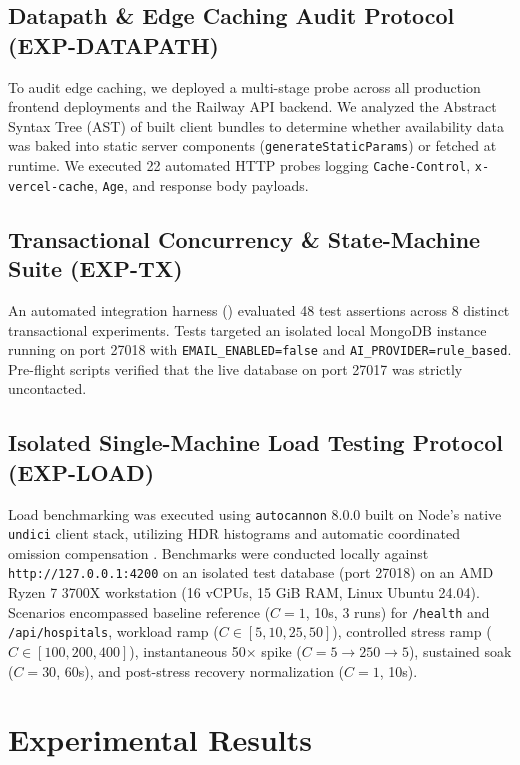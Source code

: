 \documentclass[conference]{IEEEtran}
\begin{document}
\subsection{Datapath \& Edge Caching Audit Protocol (EXP-DATAPATH)}
To audit edge caching, we deployed a multi-stage probe across all production frontend deployments and the Railway API backend. We analyzed the Abstract Syntax Tree (AST) of built client bundles to determine whether availability data was baked into static server components (\texttt{generateStaticParams}) or fetched at runtime. We executed 22 automated HTTP probes logging \texttt{Cache-Control}, \texttt{x-vercel-cache}, \texttt{Age}, and response body payloads.

\subsection{Transactional Concurrency \& State-Machine Suite (EXP-TX)}
An automated integration harness () evaluated 48 test assertions across 8 distinct transactional experiments. Tests targeted an isolated local MongoDB instance running on port 27018 with \texttt{EMAIL\_ENABLED=false} and \texttt{AI\_PROVIDER=rule\_based}. Pre-flight scripts verified that the live database on port 27017 was strictly uncontacted.

\subsection{Isolated Single-Machine Load Testing Protocol (EXP-LOAD)}
Load benchmarking was executed using \texttt{autocannon} 8.0.0 built on Node's native \texttt{undici} client stack, utilizing HDR histograms and automatic coordinated omission compensation \cite{tene2014latency}. Benchmarks were conducted locally against \texttt{http://127.0.0.1:4200} on an isolated test database (port 27018) on an AMD Ryzen 7 3700X workstation (16 vCPUs, 15 GiB RAM, Linux Ubuntu 24.04). Scenarios encompassed baseline reference ($C=1$, 10s, 3 runs) for \texttt{/health} and \texttt{/api/hospitals}, workload ramp ($C \in [5, 10, 25, 50]$), controlled stress ramp ($C \in [100, 200, 400]$), instantaneous 50$\times$ spike ($C=5 \to 250 \to 5$), sustained soak ($C=30$, 60s), and post-stress recovery normalization ($C=1$, 10s).

\section{Experimental Results}
\end{document}
